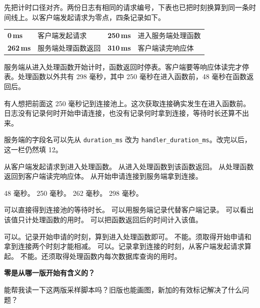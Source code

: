 \documentclass[UTF8, zihao=5, a4paper, fontset=fandol]{ctexart}
\begin{document}
\smallskip
\noindent\arole 先把计时口径对齐。两份日志有相同的请求编号，下表也已把时刻换算到同一条时间线上。以客户端发起请求为零点，四条记录如下。

\smallskip
\begingroup
\renewcommand{\arraystretch}{1.22}
\noindent\begin{tabularx}{\linewidth}{@{}lXlX@{}}
\toprule
\textbf{0\,ms}   & 客户端发起请求     & \textbf{250\,ms} & 进入服务端处理函数 \\
\textbf{262\,ms} & 服务端处理函数返回 & \textbf{310\,ms} & 客户端读完响应体 \\
\bottomrule
\end{tabularx}
\endgroup

\smallskip
服务端从进入处理函数开始计时，函数返回时停表。客户端要等响应体读完才停表。处理函数以外共有 298 毫秒，其中 250 毫秒在进入函数前，48 毫秒在函数返回后。

有人想把前面这 250 毫秒记到连接池上。这次获取连接确实发生在进入函数前。日志没有记录何时开始申请连接，也没有记录何时拿到连接，等待时长还算不出来。

服务端的字段名可以先从 \texttt{duration\_ms} 改为 \texttt{handler\_duration\_ms}。改完以后，这一栏仍然填 12。

\fourchoices
  {从客户端发起请求到进入处理函数。}
  {从进入处理函数到该函数返回。}
  {从处理函数返回到客户端读完响应体。}
  {从开始申请连接到服务端拿到连接。}

\fourchoices
  {48 毫秒。}
  {250 毫秒。}
  {262 毫秒。}
  {298 毫秒。}

\fourchoices
  {可以直接得到连接池的等待时长。}
  {可以用服务端记录代替客户端记录。}
  {可以看出该值只计处理函数的用时。}
  {可以把函数返回后的时间计入该值。}

\fourchoices
  {可以。记录开始申请的时刻，算到进入处理函数即可。}
  {不能。须取得开始申请和拿到连接两个时刻才能相减。}
  {可以。记录拿到连接的时刻，从客户端发起请求算起。}
  {不能。还须取得处理函数内每次数据库查询的用时。}


\begin{center}
{\heiti\bfseries 零是从哪一版开始有含义的？}
\end{center}

\noindent\urole 能帮我读一下这两版采样脚本吗？旧版也能画图，新加的有效标记解决了什么问题？
\end{document}
